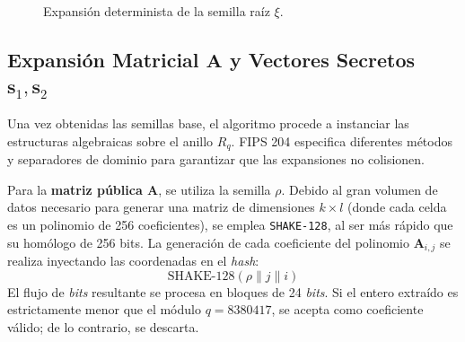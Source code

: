 \documentclass[11pt, a4paper]{report}
\theoremstyle{definition}
\begin{document}
\begin{figure}[H]
    \centering
    \caption{Expansión determinista de la semilla raíz $\xi$.}
    \label{fig:keygen_expansion}
\end{figure}

\subsection{Expansión Matricial $\mathbf{A}$ y Vectores Secretos $ \mathbf{s}_1,\mathbf{s}_2$}

Una vez obtenidas las semillas base, el algoritmo procede a instanciar las estructuras algebraicas sobre el anillo $R_q$. FIPS 204 especifica diferentes métodos y separadores de dominio para garantizar que las expansiones no colisionen.

Para la \textbf{matriz pública $\mathbf{A}$}, se utiliza la semilla $\rho$. Debido al gran volumen de datos necesario para generar una matriz de dimensiones $k \times l$ (donde cada celda es un polinomio de 256 coeficientes), se emplea \texttt{SHAKE-128}, al ser más rápido que su homólogo de 256 bits. La generación de cada coeficiente del polinomio $\mathbf{A}_{i,j}$ se realiza inyectando las coordenadas en el \textit{hash}:
$$ \text{SHAKE-128}(\rho \parallel j \parallel i) $$
El flujo de \textit{bits} resultante se procesa en bloques de 24 \textit{bits}. Si el entero extraído es estrictamente menor que el módulo $q = 8380417$, se acepta como coeficiente válido; de lo contrario, se descarta. 
\end{document}
